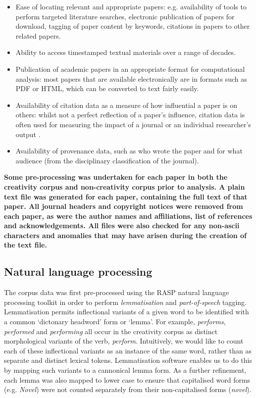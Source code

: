 \documentclass[10pt,letterpaper]{article}
\begin{document}
\begin{itemize}
\item Ease of locating relevant and appropriate papers: e.g. availability of tools to perform targeted literature searches, electronic publication of papers for download, tagging of paper content by keywords, citations in papers to other related papers.
\item Ability to access timestamped textual materials over a range of decades.
\item Publication of academic papers in an appropriate format for computational analysis: most papers that are available electronically are in formats such as PDF or HTML, which can be converted to text fairly easily.
\item Availability of citation data as a measure of how influential a paper is on others: whilst not a perfect reflection of a paper's influence, citation data is often used for measuring the impact of a journal \cite{garfield72} or an individual researcher's output \cite{hirsch05}.
\item Availability of provenance data, such as who wrote the paper and for what audience (from the disciplinary classification of the journal).
\end{itemize}
\noindent 

\textbf{Some pre-processing was undertaken for each paper in both the creativity corpus and non-creativity corpus prior to analysis. A plain text file was generated for each paper, containing the full text of that paper. All journal headers and copyright notices were removed from each paper, as were the author names and affiliations, list of references and acknowledgements. All files were also checked for any non-ascii characters and anomalies that may have arisen during the creation of the text file.}

\subsection*{Natural language processing}

The corpus data was first pre-processed using the RASP natural language processing toolkit \cite{briscoe06} in order to perform {\em lemmatisation} and {\em part-of-speech} tagging.  Lemmatisation permits inflectional variants of a given word to be identified with a common `dictonary headword' form or `lemma'.  For example,  {\em performs\/}, {\em performed\/}  and {\em performing\/} all occur in the creativity corpus as distinct morphological variants of  the  verb, {\em perform\/}.  Intuitively, we would like to count each of these inflectional variants as an instance of the same word, rather than as separate and distinct lexical tokens. Lemmatisation software enables us to do this by mapping such variants to a cannonical lemma form. As a further refinement, each lemma was also mapped to lower case to ensure that capitalised word forms (e.g. {\em Novel\/}) were not counted separately from their non-capitalised forms ({\em novel\/}).
\end{document}
